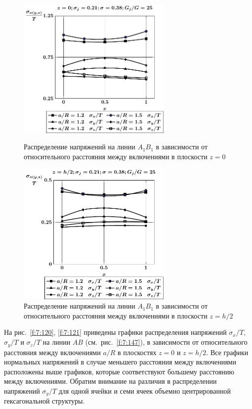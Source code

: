 \begin{figure}[h!]
\centering\footnotesize
\parbox[b]{7.5cm}{\centering\includegraphics[width=7.5cm]{inc31-a-h10-r10-g25-a1b1-z0.pdf}
\caption{Распределение напряжений на линии $A_1B_1$ в зависимости от относительного расстояния между включениями в плоскости $z=0$
\label{f:7:122}}}\hfil\hfil
\parbox[b]{7.5cm}{\centering\includegraphics[width=7.5cm]{inc31-a-h10-r10-g25-a1b1-z1.pdf}
\caption{Распределение напряжений на линии $A_1B_1$ в зависимости от относительного расстояния между включениями в плоскости $z=h/2$
\label{f:7:123}}}
\end{figure}

На рис.~\ref{f:7:120}, \ref{f:7:121} приведены графики распределения напряжений $\sigma_x/T$, $\sigma_y/T$ и $\sigma_z/T$ на линии $AB$ (см.~рис.~\ref{f:7:147}), в зависимости от относительного расстояния между включениями $a/R$ в плоскостях $z=0$ и $z=h/2$. Все графики нормальных напряжений в случае меньшего расстояния между включениями расположены выше графиков, которые соответствуют большему расстоянию между включениями. Обратим внимание на различия в распределении напряжений $\sigma_y/T$ для одной ячейки и семи ячеек объемно центрированной гексагональной структуры.

